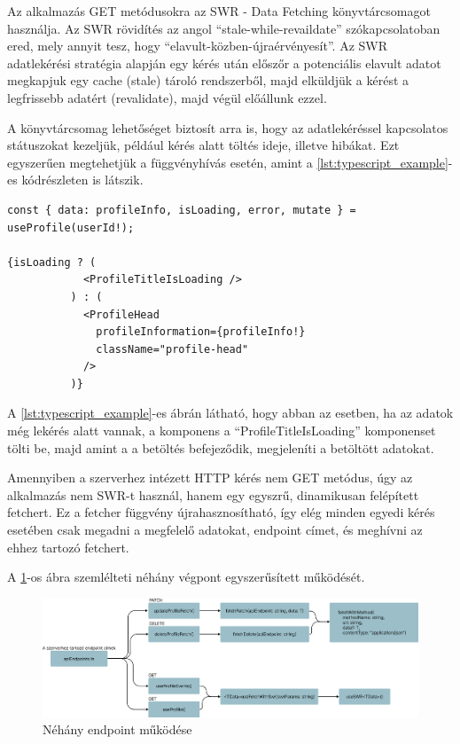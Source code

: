 Az alkalmazás GET metódusokra az SWR - Data Fetching\cite{swrdocs} könyvtárcsomagot használja. Az SWR rövidítés az angol ``stale-while-revaildate'' szókapcsolatoban ered, mely annyit tesz, hogy ``elavult-közben-újraérvényesít''. Az SWR adatlekérési stratégia alapján egy kérés után előszőr a potenciális elavult adatot megkapjuk egy cache (stale) tároló rendszerből, majd elküldjük a kérést a legfrissebb adatért (revalidate), majd végül előállunk ezzel.

A könyvtárcsomag lehetőséget biztosít arra is, hogy az adatlekéréssel kapcsolatos státuszokat kezeljük, például kérés alatt töltés ideje, illetve hibákat. Ezt egyszerűen megtehetjük a függvényhívás esetén, amint a \ref{lst:typescript_example}-es kódrészleten is látszik.

\begin{lstlisting}[caption={SWR használata profil adatok lekérésére}, label={lst:typescript_example}]
const { data: profileInfo, isLoading, error, mutate } = useProfile(userId!);

{isLoading ? (
            <ProfileTitleIsLoading />
          ) : (
            <ProfileHead
              profileInformation={profileInfo!}
              className="profile-head"
            />
          )}
\end{lstlisting}

A \ref{lst:typescript_example}-es ábrán látható, hogy abban az esetben, ha az adatok még lekérés alatt vannak, a komponens a ``ProfileTitleIsLoading'' komponenset tölti be, majd amint a a betöltés befejeződik, megjeleníti a betöltött adatokat.

Amennyiben a szerverhez intézett HTTP kérés nem GET metódus, úgy az alkalmazás nem SWR-t használ, hanem egy egyszrű, dinamikusan felépített fetchert. Ez a fetcher függvény újrahasznosítható, így elég minden egyedi kérés esetében csak megadni a megfelelő adatokat, endpoint címet, és meghívni az ehhez tartozó fetchert.

A \ref{fig:fetchingData}-os ábra szemlélteti néhány végpont egyszerűsített működését.

\begin{figure}[ht]
  \centering
  \includegraphics[width=\textwidth]{./images/fetchingData.png}
  \caption{Néhány endpoint működése}
  \label{fig:fetchingData}
\end{figure}

